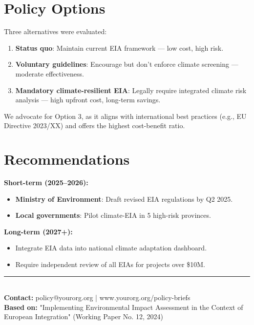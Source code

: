\documentclass[a4paper,11pt]{article}
\begin{document}
\section*{Policy Options}
Three alternatives were evaluated:
\begin{enumerate}
    \item \textbf{Status quo}: Maintain current EIA framework — low cost, high risk.
    \item \textbf{Voluntary guidelines}: Encourage but don't enforce climate screening — moderate effectiveness.
    \item \textbf{Mandatory climate-resilient EIA}: Legally require integrated climate risk analysis — high upfront cost, long-term savings.
\end{enumerate}

We advocate for Option 3, as it aligns with international best practices (e.g., EU Directive 2023/XX) and offers the highest cost-benefit ratio.

\section*{Recommendations}
\textbf{Short-term (2025–2026):}
\begin{itemize}
    \item \textbf{Ministry of Environment}: Draft revised EIA regulations by Q2 2025.
    \item \textbf{Local governments}: Pilot climate-EIA in 5 high-risk provinces.
\end{itemize}

\textbf{Long-term (2027+):}
\begin{itemize}
    \item Integrate EIA data into national climate adaptation dashboard.
    \item Require independent review of all EIAs for projects over \$10M.
\end{itemize}

\vspace{2em}
\noindent\rule{\textwidth}{0.4pt}\\
\footnotesize
\textbf{Contact:} policy@yourorg.org \quad | \quad www.yourorg.org/policy-briefs \\
\textbf{Based on:} "Implementing Environmental Impact Assessment in the Context of European Integration" (Working Paper No. 12, 2024)
\end{document}
